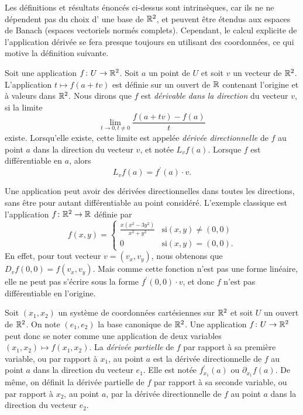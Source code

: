 Les définitions et résultats énoncés ci-dessus sont intrinsèques, car ils ne ne dépendent pas du choix 
d' une base de $\mathbb R^2$, et peuvent être étendus aux espaces de Banach (espaces vectoriels normés complets).
Cependant, le calcul explicite de l'application dérivée se fera presque toujours en utilisant des coordonnées, ce qui motive
la définition suivante. 

\begin{defn}
Soit une application $f \colon U \to \mathbb R^2$. Soit $a$ un point de $U$ et soit $v$ un vecteur de $\mathbb R^2$. L'application $t \mapsto f(a+t v)$ est définie sur un ouvert de $\mathbb R$ contenant l'origine et à valeurs dans $\mathbb R^2$. Nous dirons que $f$ est \textit{dérivable dans la direction} du vecteur $v$, si la limite 
\[\lim_{t \rightarrow 0, t \neq 0} \frac{f(a+tv)-f(a)}{t}\]
existe. Lorsqu'elle existe, cette limite est appelée \textit{dérivée directionnelle} de $f$ au point $a$ dans la direction du vecteur $v$, et notée $L_v f(a)$. Lorsque $f$ est différentiable en $a$, alors
\[L_v f(a)=f^\prime(a) \cdot v.\]
\end{defn}


Une application peut avoir des dérivées directionnelles dans toutes les directions, sans être pour autant différentiable au point considéré. L'exemple classique est l'application $f \colon \mathbb R^2 \to \mathbb R$ définie par
\[f(x,y) = \begin{cases} \frac{x(x^2-3 y^2)}{x^2 + y^2} & \text{si} (x,y) \neq (0,0) \\
0 &  \text{si} (x,y)= (0,0).
\end{cases}\]
En effet, pour tout vecteur $v=(v_x, v_y)$, nous obtenons que $D_v f(0,0) = f(v_x,v_y)$. Mais comme cette fonction n'est pas une forme linéaire, elle ne peut pas s'écrire sous la forme $f^\prime(0,0) \cdot v$, et donc $f$ n'est pas différentiable en l'origine. 

Soit $(x_1,x_2)$ un système de coordonnées cartésiennes sur $\mathbb R^2$ et soit $U$ un ouvert de $\mathbb R^2$. On note $(e_1, e_2)$ la base canonique de $\mathbb R^2$. Une application $f \colon U \to \mathbb R^2$ peut donc se noter comme une application de deux variables $(x_1,x_2) \mapsto f(x_1,x_2)$. La \textit{dérivée partielle} de $f$ par rapport à sa première variable, ou par rapport à $x_1$, au point $a$ est la dérivée directionnelle de $f$ au point $a$ dans la direction du vecteur $e_1$. Elle est notée  $f^\prime_{x_1} (a)$ ou $\partial_{x_1} f (a)$. De même, on définit la dérivée partielle de $f$ par rapport à sa seconde variable, ou par rapport à $x_2$, au point $a$, par la dérivée directionnelle de $f$ au point $a$ dans la direction du vecteur $e_2$. 

